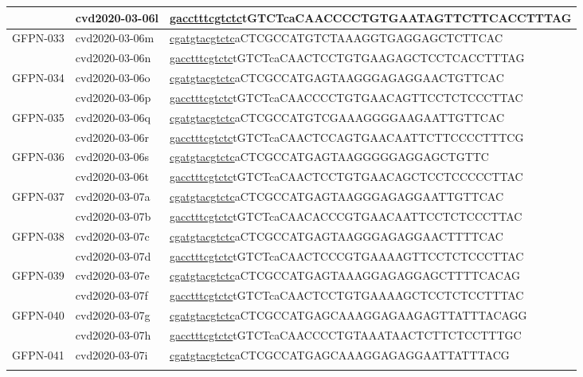 \begin{landscape}
\begin{longtable}{|l|l|l|}
		& cvd2020-03-06l & \underline{gacctttcgtctc}tGTCTcaCAACCCCTGTGAATAGTTCTTCACCTTTAG \\ \hline
		\multirow{2}{*}{GFPN-033} & cvd2020-03-06m & \underline{cgatgtacgtctc}aCTCGCCATGTCTAAAGGTGAGGAGCTCTTCAC     \\ \cline{2-3} 
		& cvd2020-03-06n & \underline{gacctttcgtctc}tGTCTcaCAACTCCTGTGAAGAGCTCCTCACCTTTAG \\ \hline
		\multirow{2}{*}{GFPN-034} & cvd2020-03-06o & \underline{cgatgtacgtctc}aCTCGCCATGAGTAAGGGAGAGGAACTGTTCAC     \\ \cline{2-3} 
		& cvd2020-03-06p & \underline{gacctttcgtctc}tGTCTcaCAACCCCTGTGAACAGTTCCTCTCCCTTAC \\ \hline
		\multirow{2}{*}{GFPN-035} & cvd2020-03-06q & \underline{cgatgtacgtctc}aCTCGCCATGTCGAAAGGGGAAGAATTGTTCAC     \\ \cline{2-3} 
		& cvd2020-03-06r & \underline{gacctttcgtctc}tGTCTcaCAACTCCAGTGAACAATTCTTCCCCTTTCG \\ \hline
		\multirow{2}{*}{GFPN-036} & cvd2020-03-06s & \underline{cgatgtacgtctc}aCTCGCCATGAGTAAGGGGGAGGAGCTGTTC       \\ \cline{2-3} 
		& cvd2020-03-06t & \underline{gacctttcgtctc}tGTCTcaCAACTCCTGTGAACAGCTCCTCCCCCTTAC \\ \hline
		\multirow{2}{*}{GFPN-037} & cvd2020-03-07a & \underline{cgatgtacgtctc}aCTCGCCATGAGTAAGGGAGAGGAATTGTTCAC     \\ \cline{2-3} 
		& cvd2020-03-07b & \underline{gacctttcgtctc}tGTCTcaCAACACCCGTGAACAATTCCTCTCCCTTAC \\ \hline
		\multirow{2}{*}{GFPN-038} & cvd2020-03-07c & \underline{cgatgtacgtctc}aCTCGCCATGAGTAAGGGAGAGGAACTTTTCAC     \\ \cline{2-3} 
		& cvd2020-03-07d & \underline{gacctttcgtctc}tGTCTcaCAACTCCCGTGAAAAGTTCCTCTCCCTTAC \\ \hline
		\multirow{2}{*}{GFPN-039} & cvd2020-03-07e & \underline{cgatgtacgtctc}aCTCGCCATGAGTAAAGGAGAGGAGCTTTTCACAG   \\ \cline{2-3} 
		& cvd2020-03-07f & \underline{gacctttcgtctc}tGTCTcaCAACTCCTGTGAAAAGCTCCTCTCCTTTAC \\ \hline
		\multirow{2}{*}{GFPN-040} & cvd2020-03-07g & \underline{cgatgtacgtctc}aCTCGCCATGAGCAAAGGAGAAGAGTTATTTACAGG  \\ \cline{2-3} 
		& cvd2020-03-07h & \underline{gacctttcgtctc}tGTCTcaCAACCCCTGTAAATAACTCTTCTCCTTTGC \\ \hline
		\multirow{2}{*}{GFPN-041} & cvd2020-03-07i & \underline{cgatgtacgtctc}aCTCGCCATGAGCAAAGGAGAGGAATTATTTACG    \\ \cline{2-3} 

\end{longtable}
\end{landscape}
